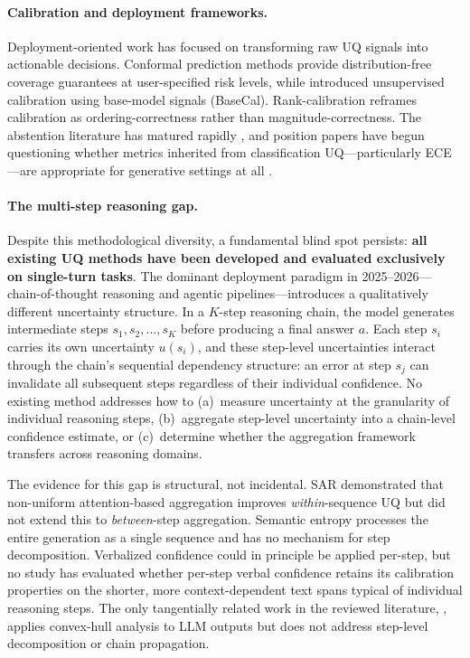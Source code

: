 \paragraph{Calibration and deployment frameworks.}
Deployment-oriented work has focused on transforming raw UQ signals into actionable decisions. Conformal prediction methods \cite{WangEtAl2025c, WangEtAl2025a} provide distribution-free coverage guarantees at user-specified risk levels, while \citet{TanEtAl2026} introduced unsupervised calibration using base-model signals (BaseCal). Rank-calibration \cite{HuangEtAl2024} reframes calibration as ordering-correctness rather than magnitude-correctness. The abstention literature has matured rapidly \cite{WenEtAl2025, ZongEtAl2026}, and position papers have begun questioning whether metrics inherited from classification UQ---particularly ECE---are appropriate for generative settings at all \cite{DevicEtAl2025, GhoshPanday2026}.

\paragraph{The multi-step reasoning gap.}
Despite this methodological diversity, a fundamental blind spot persists: \textbf{all existing UQ methods have been developed and evaluated exclusively on single-turn tasks}. The dominant deployment paradigm in 2025--2026---chain-of-thought reasoning and agentic pipelines---introduces a qualitatively different uncertainty structure. In a $K$-step reasoning chain, the model generates intermediate steps $s_1, s_2, \ldots, s_K$ before producing a final answer $a$. Each step $s_i$ carries its own uncertainty $u(s_i)$, and these step-level uncertainties interact through the chain's sequential dependency structure: an error at step $s_j$ can invalidate all subsequent steps regardless of their individual confidence. No existing method addresses how to (a)~measure uncertainty at the granularity of individual reasoning steps, (b)~aggregate step-level uncertainty into a chain-level confidence estimate, or (c)~determine whether the aggregation framework transfers across reasoning domains.

The evidence for this gap is structural, not incidental. SAR \cite{DuanEtAl2023} demonstrated that non-uniform attention-based aggregation improves \emph{within}-sequence UQ but did not extend this to \emph{between}-step aggregation. Semantic entropy \cite{FarquharEtAl2024} processes the entire generation as a single sequence and has no mechanism for step decomposition. Verbalized confidence \cite{TianEtAl2023, XiongEtAl2023} could in principle be applied per-step, but no study has evaluated whether per-step verbal confidence retains its calibration properties on the shorter, more context-dependent text spans typical of individual reasoning steps. The only tangentially related work in the reviewed literature, \citet{atakKuzlu2024}, applies convex-hull analysis to LLM outputs but does not address step-level decomposition or chain propagation.

